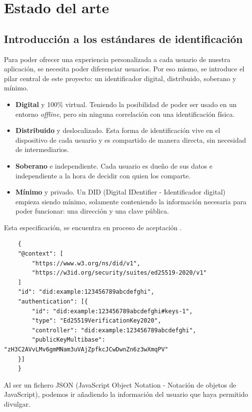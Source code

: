 \chapter{Estado del arte}\label{EdA}

\thispagestyle{fancy}


\section{Introducción a los estándares de identificación}
Para poder ofrecer una experiencia personalizada a cada usuario de nuestra aplicación, se necesita poder diferenciar usuarios. Por eso mismo, se introduce el pilar central de este proyecto: un identificador digital, distribuido, soberano y mínimo.
\begin{itemize}
    \item \textbf{Digital} y 100\% virtual. Teniendo la posibilidad de poder ser usado en un entorno \textit{offline}, pero sin ninguna correlación con una identificación física.
    \item \textbf{Distribuido} y deslocalizado. Esta forma de identificación vive en el dispositivo de cada usuario y es compartido de manera directa, sin necesidad de intermediarios.
    \item \textbf{Soberano} e independiente. Cada usuario es dueño de sus datos e independiente a la hora de decidir con quien los comparte.
    \item \textbf{Mínimo} y privado. Un DID (Digital IDentifier - Identificador digital) empieza siendo mínimo, solamente conteniendo la información necesaria para poder funcionar: una dirección y una clave pública.
\end{itemize}
Esta especificación, se encuentra en proceso de aceptación \cite{web:did-spec}.
\begin{lstlisting}
    {
    "@context": [
        "https://www.w3.org/ns/did/v1",
        "https://w3id.org/security/suites/ed25519-2020/v1"
    ]
    "id": "did:example:123456789abcdefghi",
    "authentication": [{
        "id": "did:example:123456789abcdefghi#keys-1",
        "type": "Ed25519VerificationKey2020",
        "controller": "did:example:123456789abcdefghi",
        "publicKeyMultibase": "zH3C2AVvLMv6gmMNam3uVAjZpfkcJCwDwnZn6z3wXmqPV"
    }]
    }
\end{lstlisting}
Al ser un fichero JSON (JavaScript Object Notation - Notación de objetos de JavaScript), podemos ir añadiendo la información del usuario que haya permitido divulgar.
